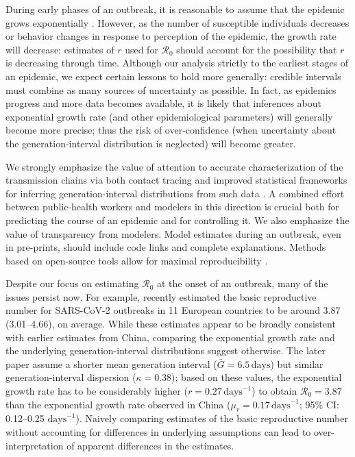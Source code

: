 \documentclass[12pt]{article}
\newcommand{\Ro}{\ensuremath{{\mathcal R}_{0}}\xspace}
\begin{document}
During early phases of an outbreak, it is reasonable to assume that the epidemic grows exponentially \citep{anderson1991infectious}.
However, as the number of susceptible individuals decreases or behavior changes in response to perception of the epidemic, the growth rate will decrease: estimates of $r$ used for \Ro should account for the possibility that $r$ is decreasing through time.
Although our analysis strictly to the earliest stages of an epidemic, we expect certain lessons to hold more generally: credible intervals must combine as many sources of uncertainty as possible. 
In fact, as epidemics progress and more data becomes available, it is likely that inferences about exponential growth rate (and other epidemiological parameters) will generally become more precise; thus the risk of over-confidence (when uncertainty about the generation-interval distribution is neglected) will become greater.

We strongly emphasize the value of attention to accurate characterization of the transmission chains via both contact tracing and improved statistical frameworks for inferring generation-interval distributions from such data \citep{britton2019estimation}.
A combined effort between public-health workers and modelers in this direction is crucial both for predicting the course of an epidemic and for controlling it.
We also emphasize the value of transparency from modelers.
Model estimates during an outbreak, even in pre-prints, should include code links and complete explanations.
Methods based on open-source tools allow for maximal reproducibility \citep{barton2020call}.

Despite our focus on estimating \Ro at the onset of an outbreak, many of the issues persist now. 
For example, \cite{flaxman2020estimating} recently estimated the basic reproductive number for SARS-CoV-2 outbreaks in 11 European countries to be around 3.87 (3.01--4.66), on average.
While these estimates appear to be broadly consistent with earlier estimates from China, comparing the exponential growth rate and the underlying generation-interval distributions suggest otherwise.
The later paper assume a shorter mean generation interval ($\bar G = 6.5\,\textrm{days}$) but similar generation-interval dispersion ($\kappa = 0.38$);
based on these values, the exponential growth rate has to be considerably higher ($r = 0.27\,\textrm{days}^{-1}$) to obtain $\Ro = 3.87$ than the exponential growth rate observed in China ($\mu_r = 0.17\,\textrm{days}^{-1}$; 95\% CI: 0.12--0.25 $\textrm{days}^{-1}$).
Naively comparing estimates of the basic reproductive number without accounting for differences in underlying assumptions can lead to over-interpretation of apparent differences in the estimates.
\end{document}
